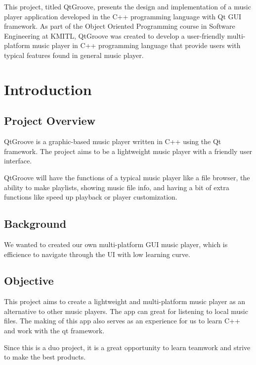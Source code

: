 \documentclass[12pt]{report} %
\begin{document}
\hspace{1cm}This project, titled QtGroove, presents the design and implementation of a music player
application developed in the C++ programming language with Qt GUI framework. As part of the
Object Oriented Programming course in Software Engineering at KMITL, QtGroove was created to develop
a user-friendly multi-platform music player in C++ programming language that provide users with typical
features found in general music player.

\newpage
\tableofcontents
\newpage

\chapter{Introduction}
\section{Project Overview}


\hspace{1cm}QtGroove is a graphic-based music player written in C++ using the Qt framework. The project
aims to be a lightweight music player with a friendly user interface. 	

QtGroove will have the functions of a typical music player like a file browser, the ability to make
playlists, showing music file info, and having a bit of extra functions like speed up playback or player
customization.


\section{Background}
\hspace{1cm}We wanted to created our own multi-platform GUI music player, which is efficience to navigate
through the UI with low learning curve.

\section{Objective}
\hspace{1cm}This project aims to create a lightweight and multi-platform music player as an alternative
to other music players. The app can great for listening to local music files. The making of this app
also serves as an experience for us to learn C++ and work with the qt framework.

Since this is a duo project, it is a great opportunity to learn teamwork and strive to make the best
products.
 
\end{document}
